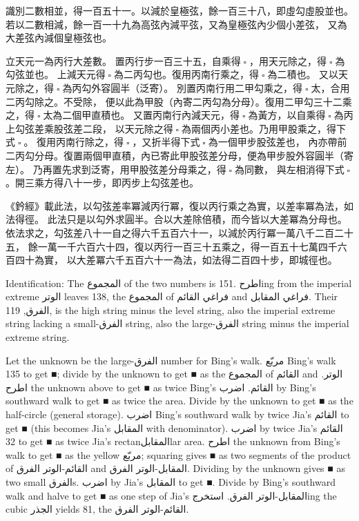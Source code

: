 \documentclass[11pt,a4paper]{article}
\newcommand{\ChinCol}[1]{\begin{minipage}[t]{0.48\textwidth}#1\end{minipage}}
\newcommand{\ArabCol}[1]{\begin{minipage}[t]{0.48\textwidth}\arabicfont\beginR #1\endR\end{minipage}}
\newcommand{\parallelsection}[2]{%
  \noindent\ChinCol{#1}\hfill\ArabCol{#2}\par\vspace{0.5cm}%
}
\begin{document}
\parallelsection{%
識別二數相並，得一百五十一。以減於皇極弦，餘一百三十八，即虛勾虛股並也。
若以二數相減，餘一百一十九為高弦內減平弦，又為皇極弦內少個小差弦，
又為大差弦內減個皇極弦也。

立天元一為丙行大差數。
置丙行步一百三十五，自乘得$ \; \square \; $，用天元除之，得$ \; \square \; $為勾弦並也。
上減天元得$ \; \square \; $為二丙勾也。復用丙南行乘之，得$ \; \square \; $為二積也。
又以天元除之，得$ \; \square \; $為丙勾外容圓半（泛寄）。
別置丙南行用二甲勾乘之，得$ \; \square \; $太，合用二丙勾除之。不受除，
便以此為甲股（內寄二丙勾為分母）。復用二甲勾三十二乘之，得$ \; \square \; $太為二個甲直積也。
又置丙南行內減天元，得$ \; \square \; $為黃方，以自乘得$ \; \square \; $為丙上勾弦差乘股弦差二段，
以天元除之得$ \; \square \; $為兩個丙小差也。乃用甲股乘之，得下式$ \; \square \; $。
復用丙南行除之，得$ \; \square \; $，又折半得下式$ \; \square \; $為一個甲步股弦差也，
內亦帶前二丙勾分母。復置兩個甲直積，內已寄此甲股弦差分母，便為甲步股外容圓半（寄左）。
乃再置先求到泛寄，用甲股弦差分母乘之，得$ \; \square \; $為同數，
與左相消得下式$ \; \square \; $。開三乘方得八十一步，即丙步上勾弦差也。

《鈐經》載此法，以勾弦差率冪減丙行冪，復以丙行乘之為實，以差率冪為法，如法得徑。
此法只是以勾外求圓半。合以大差除倍積，而今皆以大差冪為分母也。
依法求之，勾弦差八十一自之得六千五百六十一，以減於丙行冪一萬八千二百二十五，
餘一萬一千六百六十四，復以丙行一百三十五乘之，得一百五十七萬四千六百四十為實，
以大差冪六千五百六十一為法，如法得二百四十步，即城徑也。}{%
Identification: The المجموع of the two numbers is 151. اطرحing from the imperial extreme الوتر leaves 138, the المجموع of فراغي القائم and فراغي المقابل. Their الفرق, 119, is the high string minus the level string, also the imperial extreme string lacking a small-الفرق string, also the large-الفرق string minus the imperial extreme string.

Let the unknown be the large-الفرق number for Bing's walk. مربّع Bing's walk 135 to get ■; divide by the unknown to get ■ as the المجموع of القائم and الوتر. اطرح the unknown above to get ■ as twice Bing's القائم. اضرب by Bing's southward walk to get ■ as twice the area. Divide by the unknown to get ■ as the half-circle (general storage). اضرب Bing's southward walk by twice Jia's القائم to get ■ (this becomes Jia's المقابل with denominator). اضرب by twice Jia's القائم 32 to get ■ as twice Jia's rectanالمقابلlar area. اطرح the unknown from Bing's walk to get ■ as the yellow مربّع; squaring gives ■ as two segments of the product of القائم-الوتر الفرق and المقابل-الوتر الفرق. Dividing by the unknown gives ■ as two small الفرقs. اضرب by Jia's المقابل to get ■. Divide by Bing's southward walk and halve to get ■ as one step of Jia's المقابل-الوتر الفرق. استخرجing the cubic الجذر yields 81, the القائم-الوتر الفرق.

}
\end{document}
